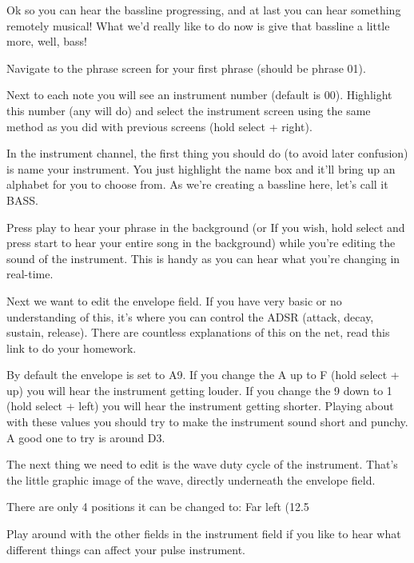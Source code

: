\documentclass[]{article}
\begin{document}
Ok so you can hear the bassline progressing, and at last you can hear something remotely musical! What we’d really like to do now is give that bassline a little more, well, bass!

Navigate to the phrase screen for your first phrase (should be phrase 01).

Next to each note you will see an instrument number (default is 00). Highlight this number (any will do) and select the instrument screen using the same method as you did with previous screens (hold select + right).

In the instrument channel, the first thing you should do (to avoid later confusion) is name your instrument. You just highlight the name box and it’ll bring up an alphabet for you to choose from. As we’re creating a bassline here, let’s call it BASS.

Press play to hear your phrase in the background (or If you wish, hold select and press start to hear your entire song in the background) while you’re editing the sound of the instrument. This is handy as you can hear what you’re changing in real-time.

Next we want to edit the envelope field. If you have very basic or no understanding of this, it’s where you can control the ADSR (attack, decay, sustain, release). There are countless explanations of this on the net, read this link to do your homework.

By default the envelope is set to A9. If you change the A up to F (hold select + up) you will hear the instrument getting louder. If you change the 9 down to 1 (hold select + left) you will hear the instrument getting shorter. Playing about with these values you should try to make the instrument sound short and punchy. A good one to try is around D3.

The next thing we need to edit is the wave duty cycle of the instrument. That’s the little graphic image of the wave, directly underneath the envelope field.

There are only 4 positions it can be changed to: Far left (12.5%

Play around with the other fields in the instrument field if you like to hear what different things can affect your pulse instrument.
\end{document}
